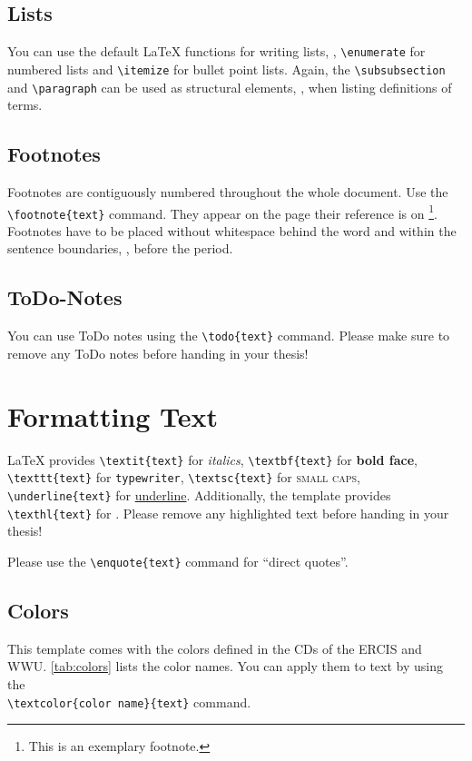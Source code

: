 \subsection{Lists}
You can use the default \LaTeX \- functions for writing lists, \viz, \texttt{\textbackslash enumerate} for numbered lists and \texttt{\textbackslash itemize} for bullet point lists. Again, the \texttt{\textbackslash subsubsection} and \texttt{\textbackslash paragraph} can be used as structural elements, \eg, when listing definitions of terms.

\subsection{Footnotes}
Footnotes are contiguously numbered throughout the whole document. Use the \texttt{\textbackslash footnote\{text\}} command.  They appear on the page their reference is on \footnote{This is an exemplary footnote.}. Footnotes have to be placed without whitespace behind the word and within the sentence boundaries, \ie, before the period.

\subsection{ToDo-Notes}
You can use ToDo notes using the \texttt{\textbackslash todo\{text\}}  command. Please make sure to remove any ToDo notes before handing in your thesis! 

\section{Formatting Text}
\LaTeX \- provides \texttt{\textbackslash textit\{text\}} for \textit{italics}, \texttt{\textbackslash textbf\{text\}} for \textbf{bold face}, \texttt{\textbackslash texttt\{text\}} for \texttt{typewriter}, \texttt{\textbackslash textsc\{text\}} for \textsc{small caps}, \texttt{\textbackslash underline\{text\}} for \underline{underline}. Additionally, the template provides  \texttt{\textbackslash texthl\{text\}} for . Please remove any highlighted text before handing in your thesis!

Please use the \texttt{\textbackslash enquote\{text\}} command for \enquote{direct quotes}.

\subsection{Colors}
This template comes with the colors defined in the \glspl{CD} of the \acrshort{ERCIS} and \acrshort{WWU}. \Tab \ref{tab:colors} lists the color names. You can apply them to text by using the  \\ \texttt{\textbackslash textcolor\{color name\}\{text\}} command.
	
